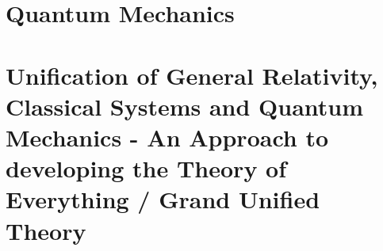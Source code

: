 \part{Quantum Mechanics}



\part{Unification of General Relativity, Classical Systems and Quantum Mechanics - An Approach to developing the Theory of Everything / Grand Unified Theory}

